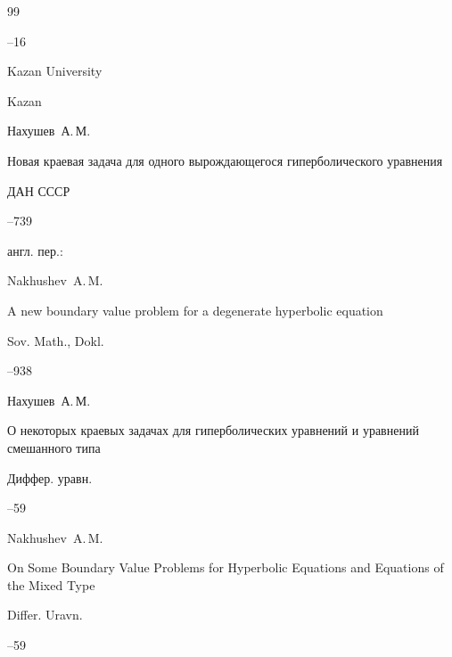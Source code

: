 \begin{thebibliography}{99}



--16

\publ Kazan University

\publaddr Kazan






\by Нахушев~А.\,М.

\paper Новая краевая задача для одного вырождающегося гиперболического уравнения 

\jour ДАН СССР

--739




\transl англ. пер.:~

\by Nakhushev~A.\,M.

\paper A new boundary value problem for a degenerate hyperbolic equation

\jour  Sov. Math., Dokl.


--938 







\by Нахушев~А.\,М.

\paper О некоторых краевых задачах для гиперболических уравнений и уравнений смешанного типа

\jour Диффер. уравн.

--59




\misctransl

\by Nakhushev~A.\,M.

\paper On Some Boundary Value Problems for Hyperbolic Equations and Equations of the Mixed Type 

\jour Differ. Uravn.

--59










\end{thebibliography}
